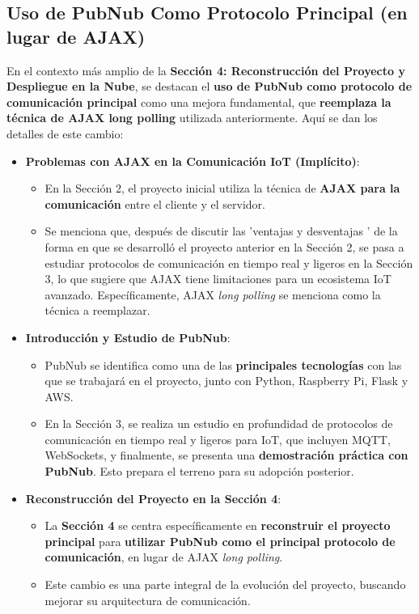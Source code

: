 \documentclass{report}
\begin{document}
\subsection{Uso de PubNub Como Protocolo Principal (en lugar de AJAX)}
En el contexto más amplio de la \textbf{Sección 4: Reconstrucción del Proyecto y Despliegue en la Nube}, se  destacan el \textbf{uso de PubNub como 
protocolo de comunicación principal} como una mejora fundamental, que \textbf{reemplaza la técnica de AJAX long polling} utilizada anteriormente. 
Aquí se dan los detalles de este cambio:

\begin{itemize}
    \item \textbf{Problemas con AJAX en la Comunicación IoT (Implícito)}:
    \begin{itemize}
        \item En la Sección 2, el proyecto inicial utiliza la técnica de \textbf{AJAX para la comunicación} entre el cliente y el servidor.
        \item Se menciona que, después de discutir las  'ventajas y desventajas ' de la forma en que se desarrolló el proyecto anterior en 
        la Sección 2, se pasa a estudiar protocolos de comunicación en tiempo real y ligeros en la Sección 3, lo que sugiere que AJAX tiene limitaciones 
        para un ecosistema IoT avanzado. Específicamente, AJAX \textit{long polling} se menciona como la técnica a reemplazar.
    \end{itemize}

    \item \textbf{Introducción y Estudio de PubNub}:
    \begin{itemize}
        \item PubNub se identifica como una de las \textbf{principales tecnologías} con las que se trabajará en el proyecto, junto con Python, Raspberry 
        Pi, Flask y AWS.
        \item En la Sección 3, se realiza un estudio en profundidad de protocolos de comunicación en tiempo real y ligeros para IoT, que incluyen MQTT, 
        WebSockets, y finalmente, se presenta una \textbf{demostración práctica con PubNub}. Esto prepara el terreno para su adopción posterior.
    \end{itemize}

    \item \textbf{Reconstrucción del Proyecto en la Sección 4}:
    \begin{itemize}
        \item La \textbf{Sección 4} se centra específicamente en \textbf{reconstruir el proyecto principal} para \textbf{utilizar PubNub como el principal 
        protocolo de comunicación}, en lugar de AJAX \textit{long polling}.
        \item Este cambio es una parte integral de la evolución del proyecto, buscando mejorar su arquitectura de comunicación.
    \end{itemize}


\end{itemize}
\end{document}
